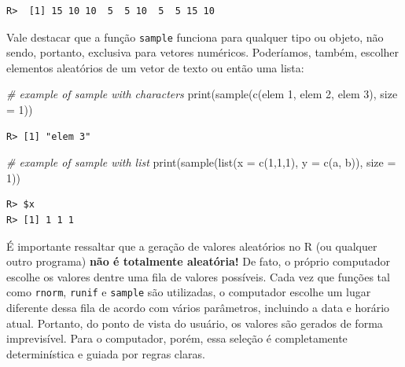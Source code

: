 \documentclass[
  11pt,
]{book}
\newenvironment{Shaded}{\begin{snugshade}}{\end{snugshade}}
\newcommand{\AttributeTok}[1]{\textcolor[rgb]{0.61,0.61,0.61}{#1}}
\newcommand{\CommentTok}[1]{\textcolor[rgb]{0.37,0.37,0.37}{\textit{#1}}}
\newcommand{\DecValTok}[1]{\textcolor[rgb]{0.06,0.06,0.06}{#1}}
\newcommand{\FunctionTok}[1]{\textcolor[rgb]{0,0,0}{#1}}
\newcommand{\NormalTok}[1]{#1}
\newcommand{\StringTok}[1]{\textcolor[rgb]{0.5,0.5,0.5}{#1}}
\begin{document}
\begin{verbatim}
R>  [1] 15 10 10  5  5 10  5  5 15 10
\end{verbatim}

Vale destacar que a função \texttt{sample} funciona para qualquer tipo ou objeto, não sendo, portanto, exclusiva para vetores numéricos. Poderíamos, também, escolher elementos aleatórios de um vetor de texto ou então uma lista:

\begin{Shaded}
\begin{Highlighting}[]
\CommentTok{\# example of sample with characters}
\FunctionTok{print}\NormalTok{(}\FunctionTok{sample}\NormalTok{(}\FunctionTok{c}\NormalTok{(}\StringTok{\textquotesingle{}elem 1\textquotesingle{}}\NormalTok{, }\StringTok{\textquotesingle{}elem 2\textquotesingle{}}\NormalTok{, }\StringTok{\textquotesingle{}elem 3\textquotesingle{}}\NormalTok{),}
             \AttributeTok{size =} \DecValTok{1}\NormalTok{))}
\end{Highlighting}
\end{Shaded}

\begin{verbatim}
R> [1] "elem 3"
\end{verbatim}

\begin{Shaded}
\begin{Highlighting}[]
\CommentTok{\# example of sample with list}
\FunctionTok{print}\NormalTok{(}\FunctionTok{sample}\NormalTok{(}\FunctionTok{list}\NormalTok{(}\AttributeTok{x =} \FunctionTok{c}\NormalTok{(}\DecValTok{1}\NormalTok{,}\DecValTok{1}\NormalTok{,}\DecValTok{1}\NormalTok{),}
                  \AttributeTok{y =} \FunctionTok{c}\NormalTok{(}\StringTok{\textquotesingle{}a\textquotesingle{}}\NormalTok{, }\StringTok{\textquotesingle{}b\textquotesingle{}}\NormalTok{)),}
             \AttributeTok{size =} \DecValTok{1}\NormalTok{))}
\end{Highlighting}
\end{Shaded}

\begin{verbatim}
R> $x
R> [1] 1 1 1
\end{verbatim}

É importante ressaltar que a geração de valores aleatórios no R (ou qualquer outro programa) \textbf{não é totalmente aleatória!} De fato, o próprio computador escolhe os valores dentre uma fila de valores possíveis. Cada vez que funções tal como \texttt{rnorm}, \texttt{runif} e \texttt{sample} são utilizadas, o computador escolhe um lugar diferente dessa fila de acordo com vários parâmetros, incluindo a data e horário atual. Portanto, do ponto de vista do usuário, os valores são gerados de forma imprevisível. Para o computador, porém, essa seleção é completamente determinística e guiada por regras claras.
\end{document}
